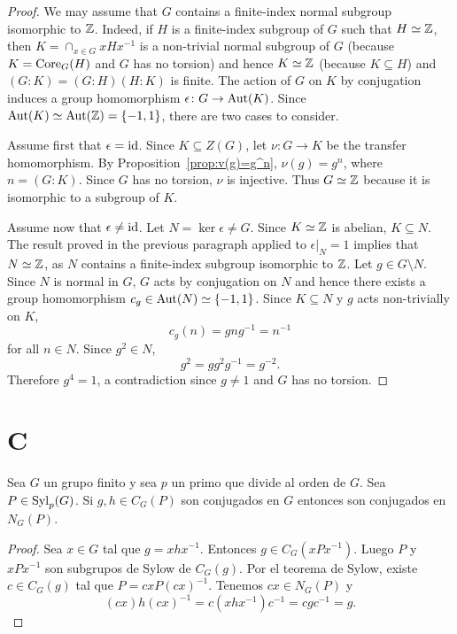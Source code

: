 \begin{proof}
	We may assume that $G$ contains a finite-index normal subgroup isomorphic to $\mathbb{Z}$. Indeed, 
	if $H$ is a finite-index subgroup of $G$ such that $H\simeq\mathbb{Z}$, then 
	$K=\cap_{x\in G}xHx^{-1}$ is a non-trivial normal subgroup of $G$ (because $K=\operatorname{Core}_G(H)$ and 
	$G$ has no torsion) and hence $K\simeq\mathbb{Z}$ (because  
	$K\subseteq H$) and $(G:K)=(G:H)(H:K)$ is finite.
	The action of $G$ on $K$ by conjugation induces a group homomorphism  
	$\epsilon\colon G\to\operatorname{Aut}(K)$. Since $\operatorname{Aut}(K)\simeq\operatorname{Aut}(\mathbb{Z})=\{-1,1\}$, 
	there are two cases to consider.
	
	Assume first that $\epsilon=\operatorname{id}$. Since $K\subseteq Z(G)$, let
	$\nu\colon G\to K$ be the transfer homomorphism. By
	Proposition~\ref{prop:v(g)=g^n}, $\nu(g)=g^n$, where $n=(G:K)$. Since
	$G$ has no torsion, $\nu$ is injective. Thus
	$G\simeq\mathbb{Z}$ because it is isomorphic to a subgroup of $K$.

	Assume now that $\epsilon\ne\operatorname{id}$. Let $N=\ker\epsilon\ne G$. Since
	$K\simeq\mathbb{Z}$ is abelian, $K\subseteq N$. The result proved in the previous paragraph 
	applied to $\epsilon|_N=1$ implies that $N\simeq\mathbb{Z}$, as 
	$N$ contains a finite-index subgroup isomorphic to $\mathbb{Z}$. Let $g\in G\setminus N$. 
	Since $N$ is normal in $G$, $G$ acts by conjugation on $N$ and hence 
	there exists a group homomorphism $c_g\in\operatorname{Aut}(N)\simeq\{-1,1\}$. Since
	$K\subseteq N$ y $g$ acts non-trivially on $K$, 
	\[
	c_g(n)=gng^{-1}=n^{-1}
	\]
	for all $n\in N$.  Since 
	$g^2\in N$, 
	\[
		g^2=gg^2g^{-1}=g^{-2}.
	\]
	Therefore $g^4=1$, a contradiction since $g\ne1$ and $G$ has no torsion.\end{proof}



\section*{C}

\begin{lemma}
	\label{lemma:normal_complement}
	Sea $G$ un grupo finito y sea $p$ un primo que divide al orden de $G$. Sea
	$P\in\mathrm{Syl}_p(G)$. Si $g,h\in C_G(P)$ son conjugados en $G$ entonces son
	conjugados en $N_G(P)$.
\end{lemma}

\begin{proof}
	Sea $x\in G$ tal que $g=xhx^{-1}$. Entonces $g\in C_G(xPx^{-1})$. Luego $P$
	y $xPx^{-1}$ son subgrupos de Sylow de $C_G(g)$. Por el teorema de Sylow,
	existe $c\in C_G(g)$ tal que $P=cxP(cx)^{-1}$. Tenemos $cx\in N_G(P)$ y 
	\[
	(cx)h(cx)^{-1}=c(xhx^{-1})c^{-1}=cgc^{-1}=g.
	\]
\end{proof}

